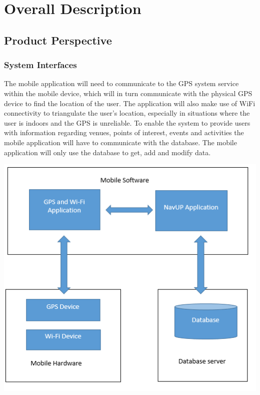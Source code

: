 \documentclass[english]{article}
\begin{document}
	\section{Overall Description}
		
		\subsection{Product Perspective}
			
				\subsubsection{System Interfaces}
				The mobile application will need to communicate to the GPS system service within the mobile device, which will in turn communicate with the physical GPS device to find the location of the user. The application will also make use of WiFi connectivity to triangulate the user's location, especially in situations where the user is indoors and the GPS is unreliable.
To enable the system to provide users with information regarding venues, points of interest, events and activities the mobile application will have to communicate with the database. The mobile application will only use the database to get, add and modify data.
				\begin{center}
										\includegraphics[scale=0.8]{Block Diagram.png}								
				\end{center}
\end{document}
